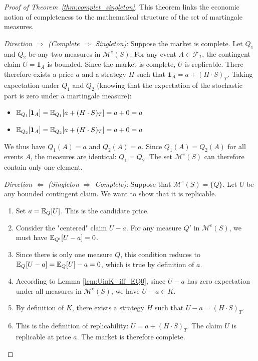 \begin{proof}[Proof of Theorem~\ref{thm:complet_singleton}]
This theorem links the economic notion of completeness to the mathematical structure of the set of martingale measures.

\emph{Direction $\Rightarrow$ (Complete $\Rightarrow$ Singleton)}:
Suppose the market is complete. Let $Q_1$ and $Q_2$ be any two measures in $\mathcal{M}^e(S)$.
For any event $A \in \mathcal{F}_T$, the contingent claim $U = \mathbf{1}_A$ is bounded.
Since the market is complete, $U$ is replicable. There therefore exists a price $a$ and a strategy $H$ such that $\mathbf{1}_A = a + (H \cdot S)_T$.
Taking expectation under $Q_1$ and $Q_2$ (knowing that the expectation of the stochastic part is zero under a martingale measure):
\begin{itemize}
    \item $\mathbb{E}_{Q_1}[\mathbf{1}_A] = \mathbb{E}_{Q_1}[a + (H \cdot S)_T] = a + 0 = a$
    \item $\mathbb{E}_{Q_2}[\mathbf{1}_A] = \mathbb{E}_{Q_2}[a + (H \cdot S)_T] = a + 0 = a$
\end{itemize}
We thus have $Q_1(A) = a$ and $Q_2(A) = a$.
Since $Q_1(A) = Q_2(A)$ for all events $A$, the measures are identical: $Q_1 = Q_2$. The set $\mathcal{M}^e(S)$ can therefore contain only one element.

\smallskip
\emph{Direction $\Leftarrow$ (Singleton $\Rightarrow$ Complete)}:
Suppose that $\mathcal{M}^e(S) = \{Q\}$. Let $U$ be any bounded contingent claim. We want to show that it is replicable.
\begin{enumerate}
    \item Set $a = \mathbb{E}_Q[U]$. This is the candidate price.
    \item Consider the "centered" claim $U - a$. For any measure $Q'$ in $\mathcal{M}^e(S)$, we must have $\mathbb{E}_{Q'}[U-a] = 0$.
    \item Since there is only one measure $Q$, this condition reduces to $\mathbb{E}_Q[U-a] = \mathbb{E}_Q[U] - a = 0$, which is true by definition of $a$.
    \item According to Lemma \ref{lem:UinK_iff_EQ0}, since $U-a$ has zero expectation under all measures in $\mathcal{M}^e(S)$, we have $U-a \in K$.
    \item By definition of $K$, there exists a strategy $H$ such that $U-a = (H \cdot S)_T$.
    \item This is the definition of replicability: $U = a + (H \cdot S)_T$. The claim $U$ is replicable at price $a$. The market is therefore complete.
\end{enumerate}
\end{proof}


